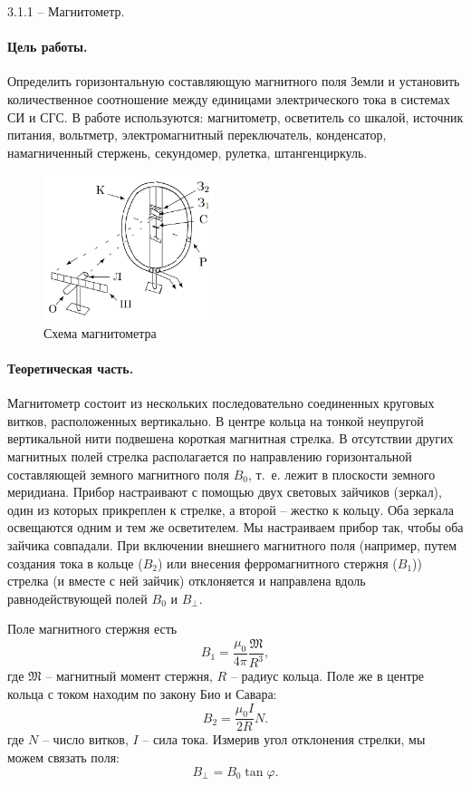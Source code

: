 \documentclass{../lab_class}
\newcommand{\magm}{\mathfrak{M}}
\begin{document}
{\Large 3.1.1 --  Магнитометр.}

\paragraph{Цель работы.}
Определить горизонтальную составляющую магнитного поля Земли и установить количественное соотношение между единицами электрического тока в системах СИ и СГС.
В работе используются: магнитометр, осветитель со шкалой, источник питания, вольтметр, электромагнитный переключатель, конденсатор, намагниченный стержень, секундомер, рулетка, штангенциркуль.

\begin{figure}
\centering
\includegraphics[width=5cm]{Fig1.png}
\caption{Схема магнитометра}
\end{figure}

\paragraph{Теоретическая часть.}
Магнитометр состоит из нескольких последовательно соединенных круговых витков, расположенных вертикально. В центре кольца на тонкой неупругой вертикальной нити подвешена короткая магнитная стрелка. В отсутствии других магнитных полей стрелка располагается по направлению горизонтальной составляющей земного магнитного поля $B_0$, т.~е. лежит в плоскости земного меридиана. Прибор настраивают с помощью двух световых зайчиков (зеркал), один из которых прикреплен к стрелке, а второй -- жестко к кольцу. Оба зеркала освещаются одним и тем же осветителем. Мы настраиваем прибор так, чтобы оба зайчика совпадали. При включении внешнего магнитного поля (например, путем создания тока в кольце ($B_2$) или внесения ферромагнитного стержня ($B_1$)) стрелка (и вместе с ней зайчик) отклоняется и направлена вдоль равнодействующей полей $B_0$ и $B_{\perp}$. 

Поле магнитного стержня есть
$$
	B_1 = \dfrac{\mu_0}{4\pi} \dfrac{\magm}{R^3},
$$
где $\magm$ -- магнитный момент стержня, $R$ -- радиус кольца. Поле же в центре кольца с током находим по закону Био и Савара:
$$
	B_2 = \dfrac{\mu_0 I}{2R} N.
$$
где $N$ -- число витков, $I$ -- сила тока. Измерив угол отклонения стрелки, мы можем связать поля:
$$
	B_{\perp} = B_0 \tan{\varphi}.
$$
\end{document}
